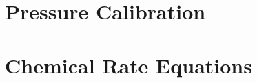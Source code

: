 \documentclass [PhD,nolistoftables,scheader] {uclathes}
\begin{document}
\chapter{Pressure Calibration} \label{sec: calibration}


\chapter{Chemical Rate Equations}


%




\end{document}
